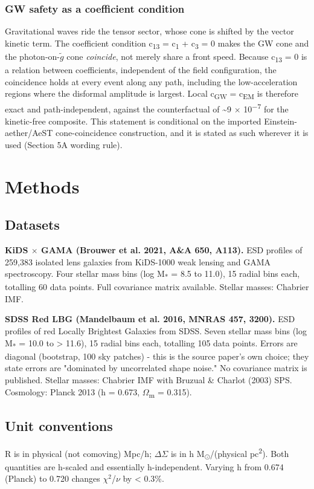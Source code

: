 \documentclass[11pt,a4paper]{article}
\begin{document}
\subsubsection{GW safety as a coefficient condition}
Gravitational waves ride the tensor sector, whose cone is shifted by the vector kinetic term. The coefficient condition c\textsubscript{13} = c\textsubscript{1} + c\textsubscript{3} = 0 makes the GW cone and the photon-on-\(\tilde{g}\) cone \emph{coincide}, not merely share a front speed. Because c\textsubscript{13} = 0 is a relation between coefficients, independent of the field configuration, the coincidence holds at every event along any path, including the low-acceleration regions where the disformal amplitude is largest. Local c\textsubscript{GW} = c\textsubscript{EM} is therefore exact and path-independent, against the counterfactual of \~{}9 $\times$ 10\textsuperscript{$-$7} for the kinetic-free composite. This statement is conditional on the imported Einstein-aether/\allowbreak{}AeST cone-coincidence construction, and it is stated as such wherever it is used (Section 5A wording rule).

\section{Methods}
\label{sec:methods}

\subsection{Datasets}
\textbf{KiDS $\times$ GAMA (Brouwer et al. 2021, A\&A 650, A113).} ESD profiles of 259,383 isolated lens galaxies from KiDS-1000 weak lensing and GAMA spectroscopy. Four stellar mass bins (log M\textsubscript{*} = 8.5 to 11.0), 15 radial bins each, totalling 60 data points. Full covariance matrix available. Stellar masses: Chabrier IMF.

\textbf{SDSS Red LBG (Mandelbaum et al. 2016, MNRAS 457, 3200).} ESD profiles of red Locally Brightest Galaxies from SDSS. Seven stellar mass bins (log M\textsubscript{*} = 10.0 to > 11.6), 15 radial bins each, totalling 105 data points. Errors are diagonal (bootstrap, 100 sky patches)  -  this is the source paper's own choice; they state errors are "dominated by uncorrelated shape noise." No covariance matrix is published. Stellar masses: Chabrier IMF with Bruzual \& Charlot (2003) SPS. Cosmology: Planck 2013 (h = 0.673, $\Omega$\textsubscript{m} = 0.315).

\subsection{Unit conventions}
R is in physical (not comoving) Mpc/\allowbreak{}h; $\Delta$$\Sigma$ is in h M\textsubscript{$\odot$}/(physical pc\textsuperscript{2}). Both quantities are h-scaled and essentially h-independent. Varying h from 0.674 (Planck) to 0.720 changes $\chi$$^{2}$/$\nu$ by < 0.3\%.
\end{document}
